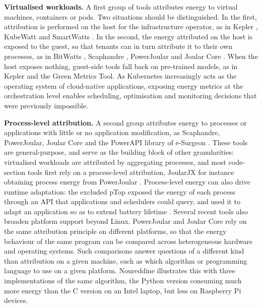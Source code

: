 \documentclass[
  acmsmall,
  screen,
  review,
  xcolor={dvipsnames,usenames}
]{acmart}
\begin{document}
\textbf{Virtualised workloads.} A first group of tools attributes energy to virtual machines, containers or pods. Two situations should be distinguished. In the first, attribution is performed on the host for the infrastructure operator, as in Kepler \cite{amaralKeplerFrameworkCalculate2023,PowerAttributionKepler}, KubeWatt \cite{pijnackerContainerlevelEnergyObservability2025} and SmartWatts \cite{fieniSmartWattsSelfCalibratingSoftwareDefined2020}. In the second, the energy attributed on the host is exposed to the guest, so that tenants can in turn attribute it to their own processes, as in BitWatts \cite{colmantProcesslevelPowerEstimation2015}, Scaphandre \cite{Scaphandre}, PowerJoular \cite{noureddinePowerJoularJoularJXMultiPlatform2022} and Joular Core \cite{noureddineJoularCoreUniversal2026}. When the host exposes nothing, guest-side tools fall back on pre-trained models, as in Kepler and the Green Metrics Tool. As Kubernetes increasingly acts as the operating system of cloud-native applications, exposing energy metrics at the orchestration level enables scheduling, optimisation and monitoring decisions that were previously impossible.

\textbf{Process-level attribution.} A second group attributes energy to processes or applications with little or no application modification, as Scaphandre, PowerJoular, Joular Core and the PowerAPI library of e-Surgeon \cite{noureddineMonitoringEnergyHotspots2015}. These tools are general-purpose, and serve as the building block of other granularities: virtualised workloads are attributed by aggregating processes, and most code-section tools first rely on a process-level attribution, JoularJX for instance obtaining process energy from PowerJoular \cite{noureddinePowerJoularJoularJXMultiPlatform2022}. Process-level energy can also drive runtime adaptation: the excluded pTop exposed the energy of each process through an API that applications and schedulers could query, and used it to adapt an application so as to extend battery lifetime \cite{doPTopProcesslevelPower2009}. Several recent tools also broaden platform support beyond Linux. PowerJoular \cite{noureddinePowerJoularJoularJXMultiPlatform2022} and Joular Core \cite{noureddineJoularCoreUniversal2026,JoularJoularcore2026} rely on the same attribution principle on different platforms, so that the energy behaviour of the same program can be compared across heterogeneous hardware and operating systems. Such comparisons answer questions of a different kind than attribution on a given machine, such as which algorithm or programming language to use on a given platform. Noureddine \cite{noureddinePowerJoularJoularJXMultiPlatform2022} illustrates this with three implementations of the same algorithm, the Python version consuming much more energy than the C version on an Intel laptop, but less on Raspberry Pi devices.
\end{document}
